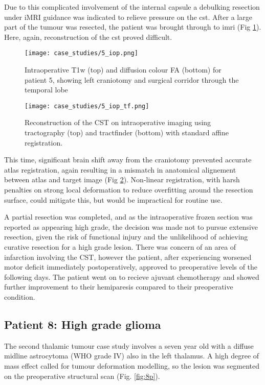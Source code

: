 Due to this complicated involvement of the internal capsule a debulking resection under iMRI guidance was indicated to relieve pressure on the \gls{cst}.
After a large part of the tumour was resected, the patient was brought through to \gls{imri} (Fig \ref{fig:5i}).
Here, again, reconstruction of the \gls{cst} proved difficult.

\begin{figure}
  \centering
  \texttt{[image: case\_studies/5\_iop.png]}
  \caption{Intraoperative T1w (top) and diffusion colour FA (bottom) for patient 5, showing left craniotomy and surgical corridor through the temporal lobe}
  \label{fig:5i}
\end{figure}

\begin{figure}
  \centering
  \texttt{[image: case\_studies/5\_iop\_tf.png]}
  \caption{Reconstruction of the CST on intraoperative imaging using tractography (top) and tractfinder (bottom) with standard affine registration.}
  \label{fig:5i_cst}
\end{figure}

This time, significant brain shift away from the craniotomy prevented accurate atlas registration, again resulting in a mismatch in anatomical alignement between atlas and target image (Fig \ref{fig:5i_cst}).
Non-linear registration, with harsh penalties on strong local deformation to reduce overfitting around the resection surface, could mitigate this, but would be impractical for routine use.

A partial resection was completed, and as the intraoperative frozen section  was reported as appearing high grade, the decision was made not to pursue extensive resection, given the risk of functional injury and the unlikelihood of achieving curative resection for a high grade lesion. 
There was concern of an area of infarction involving the CST, however the patient, after experiencing worsened motor deficit immediately postoperatively, approved to preoperative levels of the following days.
The patient went on to recieve ajuvant chemotherapy and showed further improvement to their hemiparesis compared to their preoperative condition.

\subsection{Patient 8: High grade glioma}

The second thalamic tumour case study involves a seven year old with a diffuse midline astrocytoma (WHO grade IV) also in the left thalamus.
A high degree of mass effect called for tumour deformation modelling, so the lesion was segmented on the preoperative structural scan (Fig. \ref{fig:8p}).

